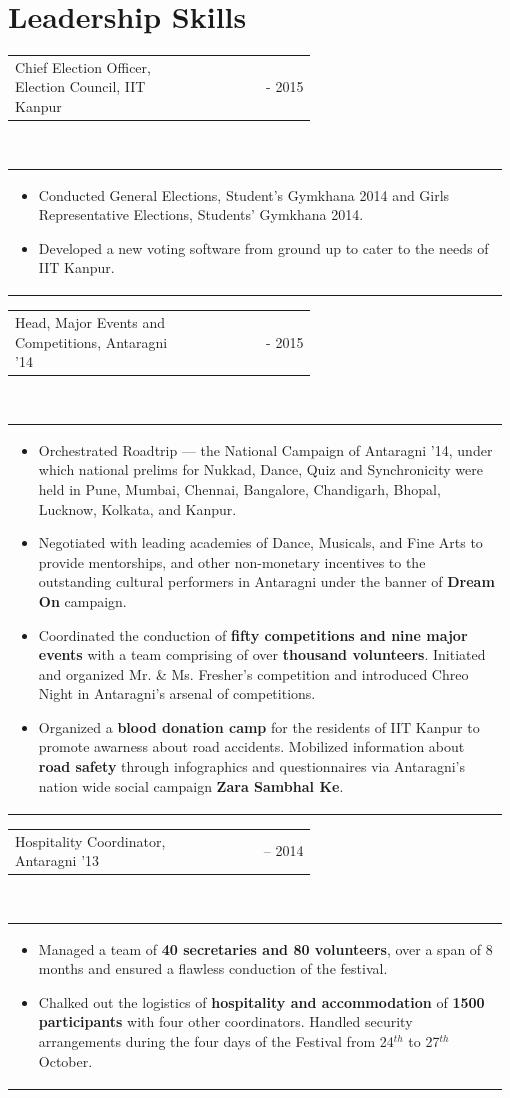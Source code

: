 \documentclass[a4paper]{article} %
\newcommand{\verticalspacing}{-0.25cm}
\newcommand{\headspace}{-0.3cm}
\newcommand{\bulletspace}{0.7cm}
\newcommand{\projectheadspacing}{6.9cm}
\newcommand{\gitproject}[3]{%
    \begin{tabular}{p{0.60\linewidth}r}
        \textcolor{NavyBlue}{\small #2} & \multicolumn{1}{m{ \projectheadspacing{} }}{\raggedleft #1}\\
    \end{tabular}\\
    \begin{tabular}{p{0.98\linewidth}}
        \vspace{\headspace{}}
        \small{#3}
    \end{tabular}
    \vspace{\verticalspacing{}}
    \vspace{-0.2cm} %
}
\begin{document}
\section {Leadership Skills}

\gitproject
    {2014 - 2015}
    {Chief Election Officer, Election Council, IIT Kanpur}
    {%
        \begin{itemize}[leftmargin=\bulletspace{}]
            \item Conducted General Elections, Student's Gymkhana 2014 and
                Girls Representative Elections, Students' Gymkhana 2014.
            \item Developed a new voting software from ground up to cater to the needs of IIT Kanpur.
        \end{itemize}
    }

\gitproject
    {2014 - 2015}
    {Head, Major Events and Competitions, Antaragni '14}
    {%
        \begin{itemize}[leftmargin=\bulletspace{}]
            \item Orchestrated Roadtrip --- the National Campaign of Antaragni '14, under which national
                prelims for Nukkad, Dance, Quiz and Synchronicity were held in Pune, Mumbai, Chennai,
                Bangalore, Chandigarh, Bhopal, Lucknow, Kolkata, and Kanpur.
            \item Negotiated with leading academies of Dance, Musicals, and Fine Arts to provide mentorships,
                and other non-monetary incentives to the outstanding cultural performers in Antaragni
                under the banner of \textbf{Dream On} campaign.
            \item Coordinated the conduction of \textbf{fifty competitions and nine major events} with a team
                comprising of over \textbf{thousand volunteers}.  Initiated and organized Mr. \& Ms. Fresher's
                competition and introduced Chreo Night in Antaragni's arsenal of competitions.
            \item Organized a \textbf{blood donation camp} for the residents of IIT Kanpur to promote awarness
                about road accidents.  Mobilized information about \textbf{road safety} through infographics
                and questionnaires via Antaragni's nation wide social campaign \textbf{Zara Sambhal Ke}.
        \end{itemize}
    }

\gitproject
    {2013 -- 2014}
    {Hospitality Coordinator, Antaragni '13}
    {%
        \begin{itemize}[leftmargin=\bulletspace{}]
            \item Managed a team of \textbf{40 secretaries and 80 volunteers}, over a span of 8 months and ensured a
                flawless conduction of the festival.
            \item Chalked out the logistics of \textbf{hospitality and accommodation} of \textbf{1500 participants}
                with four other coordinators.  Handled security arrangements during the four days of the
                Festival from 24$^{th}$ to 27$^{th}$ October.
        \end{itemize}
    }
\end{document}
